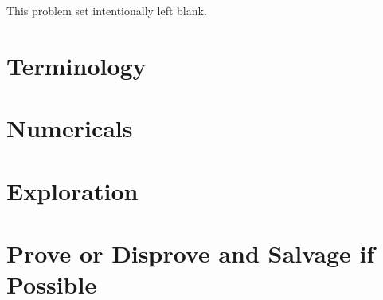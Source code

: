 \documentclass{homework}
\author{Jim Fowler}
\begin{document}
\maketitle

\begin{inspiration}
This problem set intentionally left blank.
\end{inspiration}

\section{Terminology}

\section{Numericals}

\section{Exploration}

\section{Prove or Disprove and Salvage if Possible}
\end{document}
